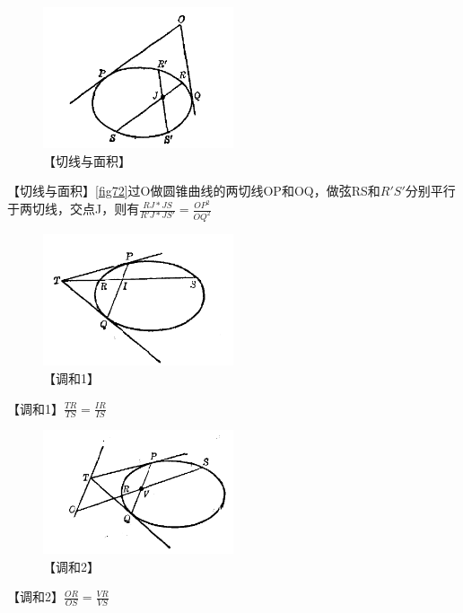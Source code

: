 \documentclass[UTF8]{../09-Mathematics}
\begin{document}
\begin{figure}[h]
    \centering
    \includegraphics[width=0.5\textwidth]{./resources/古今数学思想-图4_26.png}
    \caption{【切线与面积】}
\end{figure}\label{fig72}


【切线与面积】\ref{fig72}过O做圆锥曲线的两切线OP和OQ，做弦RS和$R'S'$分别平行于两切线，交点J，则有$ \frac{RJ*JS}{R'J*JS'} = \frac{OP^2}{OQ^2}$


\begin{figure}[h]
    \centering
    \includegraphics[width=0.5\textwidth]{./resources/古今数学思想-图4_27.png}
    \caption{【调和1】}\label{fig:7}
\end{figure}
【调和1】$ \frac{TR}{TS} = \frac{IR}{IS}$


\begin{figure}[h]
    \centering
    \includegraphics[width=0.5\textwidth]{./resources/古今数学思想-图4_28.png}
    \caption{【调和2】}\label{fig:7}
\end{figure}
【调和2】$ \frac{OR}{OS} = \frac{VR}{VS}$
\end{document}
